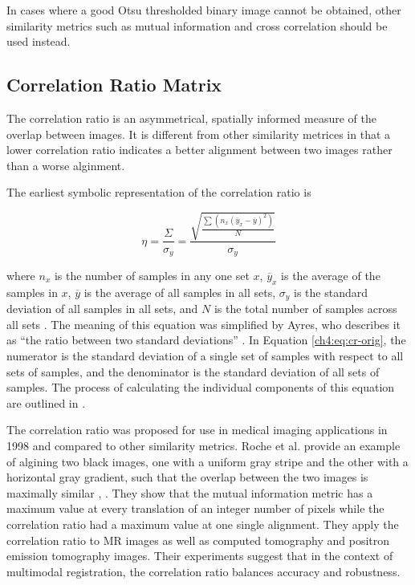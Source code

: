 In cases where a good Otsu thresholded binary image cannot be obtained, other similarity metrics such as mutual information and cross correlation should be used instead.

\subsection{Correlation Ratio Matrix}

The correlation ratio is an asymmetrical, spatially informed measure of the overlap between images. It is different from other similarity metrices in that a lower correlation ratio indicates a better alignment between two images rather than a worse alginment. 

The earliest symbolic representation of the correlation ratio is 

\begin{equation}
\label{ch4:eq:cr-orig}
\eta = \frac{\Sigma}{\sigma_y} = \frac{\sqrt{\frac{\sum(n_x(\overline{y}_x - \overline{y})^2)}{N}}}{\sigma_y}
\end{equation}

\noindent where $n_x$ is the number of samples in any one set $x$, $\overline{y}_x$ is the average of the samples in $x$, $\overline{y}$ is the average of all samples in all sets, $\sigma_y$ is the standard deviation of all samples in all sets, and $N$ is the total number of samples across all sets \cite{Rugg1917}. The meaning of this equation was simplified by Ayres, who describes it as ``the ratio between two standard deviations'' \cite{Ayres1920}. In Equation \ref{ch4:eq:cr-orig}, the numerator is the standard deviation of a single set of samples with respect to all sets of samples, and the denominator is the standard deviation of all sets of samples. The process of calculating the individual components of this equation are outlined in \cite{Rugg1917}.

The correlation ratio was proposed for use in medical imaging applications in 1998 and compared to other similarity metrics. Roche et al. provide an example of algining two black images, one with a uniform gray stripe and the other with a horizontal gray gradient, such that the overlap between the two images is maximally similar \cite{Roche1998a}, \cite{Roche1998}. They show that the mutual information metric has a maximum value at every translation of an integer number of pixels while the correlation ratio had a maximum value at one single alignment. They apply the correlation ratio to MR images as well as computed tomography and positron emission tomography images. Their experiments suggest that in the context of multimodal registration, the correlation ratio balances accuracy and robustness.

